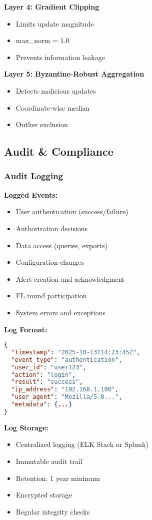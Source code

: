\documentclass[12pt,a4paper]{article}
\begin{document}
\textbf{Layer 4: Gradient Clipping}
\begin{itemize}[leftmargin=1cm,itemsep=0pt]
    \item Limits update magnitude
    \item max\_norm = 1.0
    \item Prevents information leakage
\end{itemize}

\textbf{Layer 5: Byzantine-Robust Aggregation}
\begin{itemize}[leftmargin=1cm,itemsep=0pt]
    \item Detects malicious updates
    \item Coordinate-wise median
    \item Outlier exclusion
\end{itemize}

\subsection{Audit \& Compliance}

\subsubsection{Audit Logging}

\textbf{Logged Events:}
\begin{itemize}[leftmargin=1cm,itemsep=0pt]
    \item User authentication (success/failure)
    \item Authorization decisions
    \item Data access (queries, exports)
    \item Configuration changes
    \item Alert creation and acknowledgment
    \item FL round participation
    \item System errors and exceptions
\end{itemize}

\textbf{Log Format:}
\begin{lstlisting}[language=json]
{
  "timestamp": "2025-10-13T14:23:45Z",
  "event_type": "authentication",
  "user_id": "user123",
  "action": "login",
  "result": "success",
  "ip_address": "192.168.1.100",
  "user_agent": "Mozilla/5.0...",
  "metadata": {...}
}
\end{lstlisting}

\textbf{Log Storage:}
\begin{itemize}[leftmargin=1cm,itemsep=0pt]
    \item Centralized logging (ELK Stack or Splunk)
    \item Immutable audit trail
    \item Retention: 1 year minimum
    \item Encrypted storage
    \item Regular integrity checks
\end{itemize}
\end{document}
